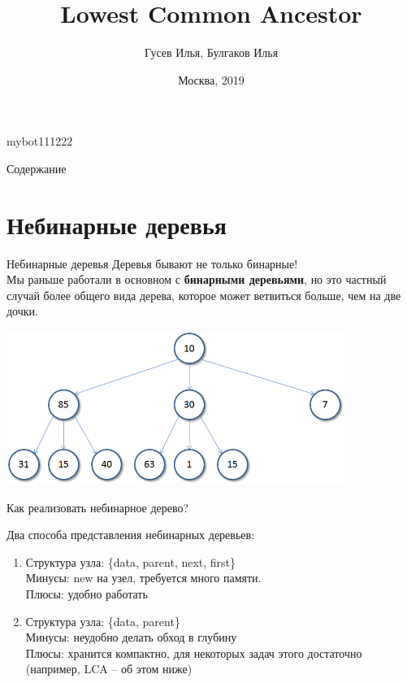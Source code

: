 mybot111222\documentclass[10pt]{beamer}
\title[\href{https://goo.gl/NRgp8K}{https://goo.gl/NRgp8K} (Term 2)]{Lowest Common Ancestor}
\author[Гусев Илья, Булгаков Илья]{Гусев Илья, Булгаков Илья}
\institute[МФТИ] 
{Московский физико-технический институт\\*}
\date{Москва, 2019}
\begin{document}
\begin{frame}
  \titlepage
\end{frame}

\begin{frame}{Содержание}
\tableofcontents
\end{frame}


\section{Небинарные деревья}

\begin{frame}[fragile]{Небинарные деревья}
Деревья бывают не только бинарные! \\
Мы раньше работали в основном с \textbf{бинарными деревьями}, но это частный случай более общего вида дерева, которое может ветвиться больше, чем на две дочки.

\begin{center}
    \includegraphics[height=5cm]{Term_2/Source/images/10-ternary_tree.png}
\end{center}

\end{frame}

\begin{frame}[fragile]{Как реализовать небинарное дерево?}

Два способа представления небинарных деревьев:
\begin{enumerate}
    \item Структура узла: \{data, parent, next, first\} \\
Минусы: new на узел, требуется много памяти. \\
Плюсы: удобно работать
    \item Структура узла: \{data, parent\} \\
Минусы: неудобно делать обход в глубину \\
Плюсы: хранится компактно, для некоторых задач этого достаточно (например, LCA -- об этом ниже)
\end{enumerate}

\end{frame}
\end{document}
